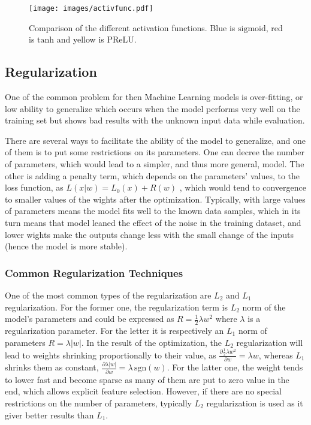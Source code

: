 \begin{figure}[]
	\centering
	\texttt{[image: images/activfunc.pdf]}
	\caption{Comparison of the different activation functions. Blue is $\mathrm{sigmoid}$, red is $\mathrm{tanh}$ and yellow is $\mathrm{PReLU}$.}
	\label{fig:act_func}
\end{figure}


\subsection{Regularization}

One of the common problem for then Machine Learning models is over-fitting, or low ability to generalize which occurs when the model performs very well on the training set but shows bad results with the unknown input data while evaluation.
\medskip

There are several ways to facilitate the ability of the model to generalize, and one of them is to put some restrictions on its parameters.
One can decree the number of parameters, which would lead to a simpler, and thus more general, model.
The other is adding a penalty term, which depends on the parameters' values, to the loss function, as $L(x|w) = L_{0}(x) + R(w)$ , which would tend to convergence to smaller values of the wights after the optimization. 
Typically, with large values of parameters means the model fits well to the known data samples, which in its turn means that model leaned the effect of the noise in the training dataset, and lower wights make the outputs change less with the small change of the inputs (hence the model is more stable).
\medskip

\subsubsection{Common Regularization Techniques}

One of the most common types of the regularization are $L_{2}$ and $L_{1}$ regularization.
For the former one, the regularization term is $L_{2}$ norm of the model's parameters and could be expressed as $R=\frac{1}{2}\lambda w^{2}$ where $\lambda$ is a regularization parameter.
For the letter it is respectively an $L_{1}$ norm of parameters $R=\lambda |w|$.
In the result of the optimization, the $L_{2}$ regularization will lead to weights shrinking proportionally to their value, as $\frac{\partial \frac{1}{2} \lambda w^{2} }{\partial w} = \lambda w$, whereas $L_{1}$ shrinks them as constant, $\frac{\partial \lambda |w| }{\partial w} = \lambda \, \mathrm{sgn}(w) $.
For the latter one, the weight tends to lower fast and become sparse as many of them are put to zero value in the end, which allows explicit feature selection.
However, if there are no special restrictions on the number of parameters, typically $L_{2}$ regularization is used as it giver better results than $L_{1}$.
\medskip

